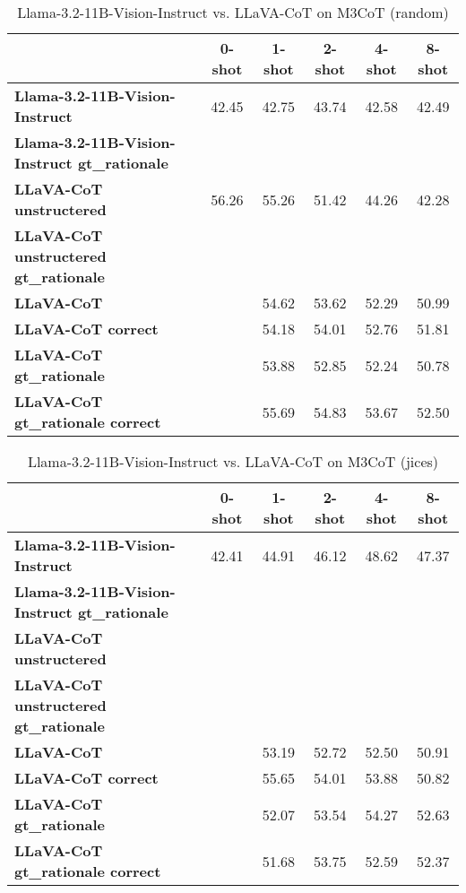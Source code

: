 \begin{table}
\caption{Llama-3.2-11B-Vision-Instruct vs. LLaVA-CoT on M3CoT (random)}
\label{tab:Llama-3.2-11B-Vision-Instruct_M3CoT_TRAIN_random}
\begin{tabular}{lccccc}
\toprule
 & 0-shot & 1-shot & 2-shot & 4-shot & 8-shot \\
\midrule
\textbf{Llama-3.2-11B-Vision-Instruct} & 42.45 & 42.75 & 43.74 & 42.58 & 42.49 \\
\textbf{Llama-3.2-11B-Vision-Instruct gt\_rationale} &  &  &  &  &  \\
\textbf{LLaVA-CoT unstructered} & 56.26 & 55.26 & 51.42 & 44.26 & 42.28 \\
\textbf{LLaVA-CoT unstructered gt\_rationale} &  &  &  &  &  \\
\textbf{LLaVA-CoT} &  & 54.62 & 53.62 & 52.29 & 50.99 \\
\textbf{LLaVA-CoT correct} &  & 54.18 & 54.01 & 52.76 & 51.81 \\
\textbf{LLaVA-CoT gt\_rationale} &  & 53.88 & 52.85 & 52.24 & 50.78 \\
\textbf{LLaVA-CoT gt\_rationale correct} &  & 55.69 & 54.83 & 53.67 & 52.50 \\
\bottomrule
\end{tabular}
\end{table}


\begin{table}
\caption{Llama-3.2-11B-Vision-Instruct vs. LLaVA-CoT on M3CoT (jices)}
\label{tab:Llama-3.2-11B-Vision-Instruct_M3CoT_TRAIN_jices}
\begin{tabular}{lccccc}
\toprule
 & 0-shot & 1-shot & 2-shot & 4-shot & 8-shot \\
\midrule
\textbf{Llama-3.2-11B-Vision-Instruct} & 42.41 & 44.91 & 46.12 & 48.62 & 47.37 \\
\textbf{Llama-3.2-11B-Vision-Instruct gt\_rationale} &  &  &  &  &  \\
\textbf{LLaVA-CoT unstructered} &  &  &  &  &  \\
\textbf{LLaVA-CoT unstructered gt\_rationale} &  &  &  &  &  \\
\textbf{LLaVA-CoT} &  & 53.19 & 52.72 & 52.50 & 50.91 \\
\textbf{LLaVA-CoT correct} &  & 55.65 & 54.01 & 53.88 & 50.82 \\
\textbf{LLaVA-CoT gt\_rationale} &  & 52.07 & 53.54 & 54.27 & 52.63 \\
\textbf{LLaVA-CoT gt\_rationale correct} &  & 51.68 & 53.75 & 52.59 & 52.37 \\
\bottomrule
\end{tabular}
\end{table}


